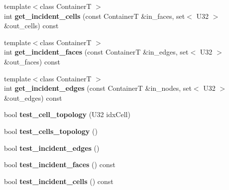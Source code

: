 \begin{DoxyCompactItemize}
\item 
\hypertarget{classps_1_1elastic_1_1VolMesh_a7014b6c276e42bbeac0a9448ccf4d646}{}{\footnotesize template$<$class Container\+T $>$ }\\int {\bfseries get\+\_\+incident\+\_\+cells} (const Container\+T \&in\+\_\+faces, set$<$ U32 $>$ \&out\+\_\+cells) const \label{classps_1_1elastic_1_1VolMesh_a7014b6c276e42bbeac0a9448ccf4d646}

\item 
\hypertarget{classps_1_1elastic_1_1VolMesh_a179baac43bb17ed6649a97a24a6046ae}{}{\footnotesize template$<$class Container\+T $>$ }\\int {\bfseries get\+\_\+incident\+\_\+faces} (const Container\+T \&in\+\_\+edges, set$<$ U32 $>$ \&out\+\_\+faces) const \label{classps_1_1elastic_1_1VolMesh_a179baac43bb17ed6649a97a24a6046ae}

\item 
\hypertarget{classps_1_1elastic_1_1VolMesh_a9883a2d3dc5c6ff11a695ffd969c8c0d}{}{\footnotesize template$<$class Container\+T $>$ }\\int {\bfseries get\+\_\+incident\+\_\+edges} (const Container\+T \&in\+\_\+nodes, set$<$ U32 $>$ \&out\+\_\+edges) const \label{classps_1_1elastic_1_1VolMesh_a9883a2d3dc5c6ff11a695ffd969c8c0d}

\item 
\hypertarget{classps_1_1elastic_1_1VolMesh_ad0a4b9e354728e2f5a6f7b48e4b04bf5}{}bool {\bfseries test\+\_\+cell\+\_\+topology} (U32 idx\+Cell)\label{classps_1_1elastic_1_1VolMesh_ad0a4b9e354728e2f5a6f7b48e4b04bf5}

\item 
\hypertarget{classps_1_1elastic_1_1VolMesh_a86aa2fd8fe0b8549a686da18f1c8c3b9}{}bool {\bfseries test\+\_\+cells\+\_\+topology} ()\label{classps_1_1elastic_1_1VolMesh_a86aa2fd8fe0b8549a686da18f1c8c3b9}

\item 
\hypertarget{classps_1_1elastic_1_1VolMesh_aa752e76ab675865d94241d0331ae4afe}{}bool {\bfseries test\+\_\+incident\+\_\+edges} ()\label{classps_1_1elastic_1_1VolMesh_aa752e76ab675865d94241d0331ae4afe}

\item 
\hypertarget{classps_1_1elastic_1_1VolMesh_a455742cfc630ca08fb685f77c6ab6747}{}bool {\bfseries test\+\_\+incident\+\_\+faces} () const \label{classps_1_1elastic_1_1VolMesh_a455742cfc630ca08fb685f77c6ab6747}

\item 
\hypertarget{classps_1_1elastic_1_1VolMesh_a9bc4f2b019fd887cf021baab0b03e9b2}{}bool {\bfseries test\+\_\+incident\+\_\+cells} () const \label{classps_1_1elastic_1_1VolMesh_a9bc4f2b019fd887cf021baab0b03e9b2}


\end{DoxyCompactItemize}
